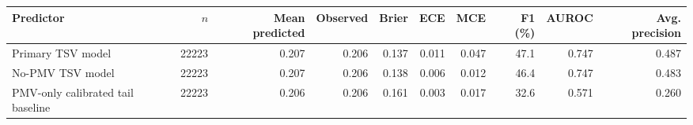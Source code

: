 \begin{tabular}{lrrrrrrrrr}
\toprule
Predictor & $n$ & Mean predicted & Observed & Brier & ECE & MCE & F1 (\%) & AUROC & Avg. precision \\
\midrule
Primary TSV model & 22223 & 0.207 & 0.206 & 0.137 & 0.011 & 0.047 & 47.1 & 0.747 & 0.487 \\
No-PMV TSV model & 22223 & 0.207 & 0.206 & 0.138 & 0.006 & 0.012 & 46.4 & 0.747 & 0.483 \\
PMV-only calibrated tail baseline & 22223 & 0.206 & 0.206 & 0.161 & 0.003 & 0.017 & 32.6 & 0.571 & 0.260 \\
\bottomrule
\end{tabular}

